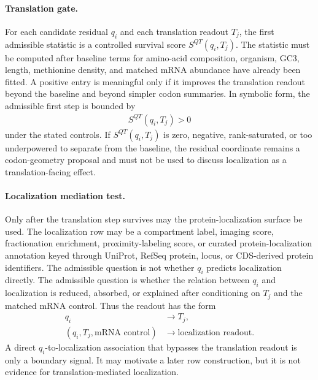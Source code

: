 \paragraph{Translation gate.}
For each candidate residual $q_i$ and each translation readout $T_j$, the first admissible statistic is a controlled survival score $S^{QT}(q_i,T_j)$. The statistic must be computed after baseline terms for amino-acid composition, organism, GC3, length, methionine density, and matched mRNA abundance have already been fitted. A positive entry is meaningful only if it improves the translation readout beyond the baseline and beyond simpler codon summaries. In symbolic form, the admissible first step is bounded by
$$
\begin{aligned}
S^{QT}(q_i,T_j) > 0
\end{aligned}
$$
under the stated controls. If $S^{QT}(q_i,T_j)$ is zero, negative, rank-saturated, or too underpowered to separate from the baseline, the residual coordinate remains a codon-geometry proposal and must not be used to discuss localization as a translation-facing effect.

\paragraph{Localization mediation test.}
Only after the translation step survives may the protein-localization surface be used. The localization row may be a compartment label, imaging score, fractionation enrichment, proximity-labeling score, or curated protein-localization annotation keyed through UniProt, RefSeq protein, locus, or CDS-derived protein identifiers. The admissible question is not whether $q_i$ predicts localization directly. The admissible question is whether the relation between $q_i$ and localization is reduced, absorbed, or explained after conditioning on $T_j$ and the matched mRNA control. Thus the readout has the form
$$
\begin{aligned}
q_i &\longrightarrow T_j,\\
(q_i,T_j,\text{mRNA control}) &\longrightarrow \text{localization readout}.
\end{aligned}
$$
A direct $q_i$-to-localization association that bypasses the translation readout is only a boundary signal. It may motivate a later row construction, but it is not evidence for translation-mediated localization.

